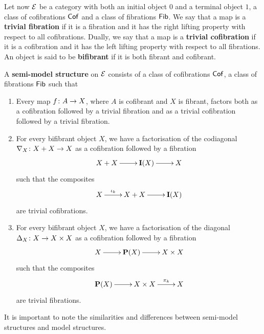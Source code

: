 \documentclass[reqno,10pt,a4paper,oneside,draft]{amsart}
\begin{document}
\medskip

Let now $\cal{E}$ be a category with both an initial object $0$ and a terminal object $1$,
a class of cofibrations $\Cof$ and a class of fibrations $\Fib$. We say that a map is a {\bf trivial fibration}
if it is a fibration and it has the right lifting property with respect to all cofibrations. Dually, we say that
a map is a {\bf trivial cofibration} if it is a cofibration and it has the left lifting property with respect to
all fibrations. An object is said to be {\bf bifibrant} if it is both fibrant and cofibrant.


\begin{definition} A {\bf semi-model structure} on $\cal{E}$ consists of a class of cofibrations $\Cof$, a class of
fibrations $\Fib$ such that
\begin{enumerate}[(SM1)]
\item Every map $f \co A \to X$, where $A$ is cofibrant and $X$ is fibrant, factors both as a
cofibration followed by a trivial fibration and as a trivial cofibration followed by a trivial fibration.
\item For every bifibrant object $X$, we have a factorisation of the codiagonal $\nabla_X \co 
X + X \to X$ as a cofibration followed by a fibration 
\[
\xymatrix{X + X \ar[r] &  {\bf I}(X) \ar[r] & X}
\]
such that the composites 
\[
\xymatrix{X \ar[r]^-{\iota_k}  & X+X \ar[r] & {\bf I }(X)}
\]
are trivial cofibrations.
\item For every bifibrant object $X$, we have a factorisation of the diagonal $\Delta_X \co X \to 
X \times X$ as a cofibration followed by a fibration
\[
\xymatrix{X  \ar[r]  & {\bf P}(X) \ar[r] & X \times X }
 \]
 such that the composites
\[
\xymatrix{ {\bf P}(X) \ar[r] &  X \times X \ar[r]^-{\pi_k} &  X }
\]
are trivial fibrations.
\end{enumerate}
\end{definition}

\bigskip



It is important to note the similarities and differences between semi-model structures and model
structures. 



\nocite{*}







\end{document}
